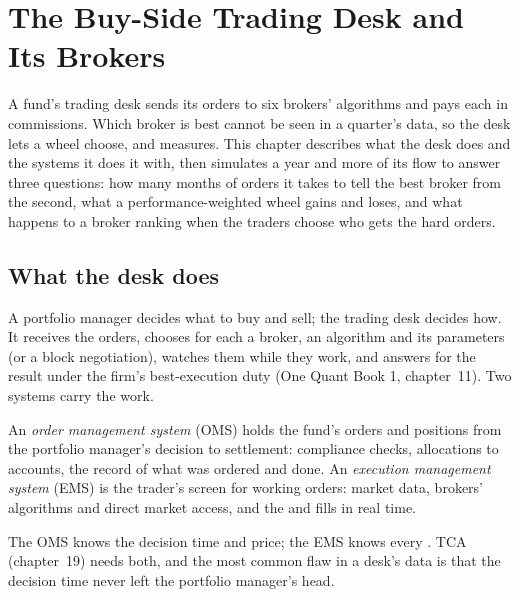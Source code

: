 \chapter{The Buy-Side Trading Desk and Its Brokers}\label{ch:mx:the-buy-side-trading-desk-and-its-brokers}

A fund's trading desk sends its orders to six brokers' algorithms and pays each in commissions. Which broker is best cannot be seen in a quarter's
data, so the desk lets a wheel choose, and measures. This chapter describes what the desk does and the systems it does it with, then simulates a
year and more of its flow to answer three questions: how many months of orders it takes to tell the best broker from the second, what a
performance-weighted wheel gains and loses, and what happens to a broker ranking when the traders choose who gets the hard orders.

\section{What the desk does}

A portfolio manager decides what to buy and sell; the trading desk decides how. It receives the orders, chooses for each a broker, an algorithm and
its parameters (or a block negotiation), watches them while they work, and answers for the result under the firm's best-execution duty (One Quant Book
1, chapter~11). Two systems carry the work.

\begin{definition}\label{def:mx:the-buy-side-trading-desk-and-its-brokers:oms}
An \emph{order management system} (OMS) holds the fund's orders and positions from the portfolio manager's decision to
settlement: compliance checks, allocations to accounts, the record of what was ordered and done. An \emph{execution management system} (EMS) is the trader's screen for working orders: market data, brokers' algorithms and direct market access, and the  and
fills in real time.
\end{definition}

The OMS knows the decision time and price; the EMS knows every . TCA (chapter~19) needs both, and the most common flaw in a desk's data is
that the decision time never left the portfolio manager's head.

